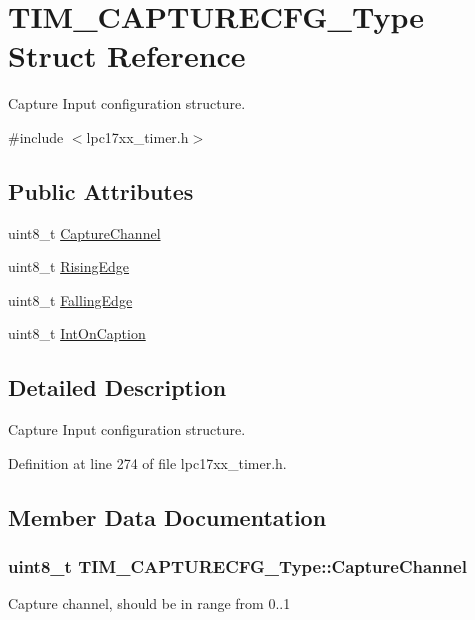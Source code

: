\hypertarget{struct_t_i_m___c_a_p_t_u_r_e_c_f_g___type}{\section{\-T\-I\-M\-\_\-\-C\-A\-P\-T\-U\-R\-E\-C\-F\-G\-\_\-\-Type \-Struct \-Reference}
\label{struct_t_i_m___c_a_p_t_u_r_e_c_f_g___type}
}


\-Capture \-Input configuration structure.  




{\ttfamily \#include $<$lpc17xx\-\_\-timer.\-h$>$}

\subsection*{\-Public \-Attributes}
\begin{DoxyCompactItemize}
\item 
uint8\-\_\-t \hyperlink{struct_t_i_m___c_a_p_t_u_r_e_c_f_g___type_ac7cf2dc3645c824dfe8e8fbb92708cad}{\-Capture\-Channel}
\item 
uint8\-\_\-t \hyperlink{struct_t_i_m___c_a_p_t_u_r_e_c_f_g___type_adea8cb5ca2c12442832604d59f07c125}{\-Rising\-Edge}
\item 
uint8\-\_\-t \hyperlink{struct_t_i_m___c_a_p_t_u_r_e_c_f_g___type_ab05f10444c122dfb09c673e5705ac74d}{\-Falling\-Edge}
\item 
uint8\-\_\-t \hyperlink{struct_t_i_m___c_a_p_t_u_r_e_c_f_g___type_a5b7ba6329ccf91f68be78106c9572059}{\-Int\-On\-Caption}
\end{DoxyCompactItemize}


\subsection{\-Detailed \-Description}
\-Capture \-Input configuration structure. 

\-Definition at line 274 of file lpc17xx\-\_\-timer.\-h.



\subsection{\-Member \-Data \-Documentation}
\hypertarget{struct_t_i_m___c_a_p_t_u_r_e_c_f_g___type_ac7cf2dc3645c824dfe8e8fbb92708cad}{
\subsubsection[{\-Capture\-Channel}]{\setlength{\rightskip}{0pt plus 5cm}uint8\-\_\-t {\bf \-T\-I\-M\-\_\-\-C\-A\-P\-T\-U\-R\-E\-C\-F\-G\-\_\-\-Type\-::\-Capture\-Channel}}}\label{struct_t_i_m___c_a_p_t_u_r_e_c_f_g___type_ac7cf2dc3645c824dfe8e8fbb92708cad}
\-Capture channel, should be in range from 0..1 

